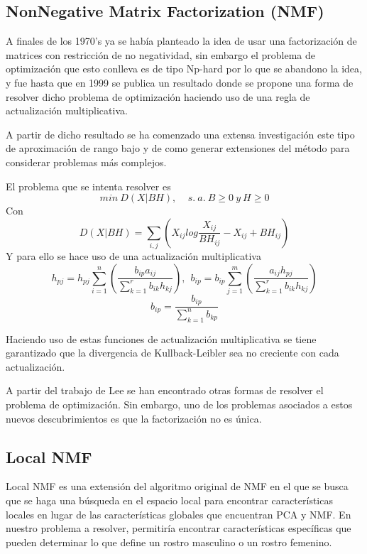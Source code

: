 \documentclass[a0,portrait]{a0poster}
\begin{document}
\begin{multicols}{3}
\subsection*{NonNegative Matrix Factorization (NMF)}
A finales de los 1970's ya se había planteado la idea de usar una factorización de matrices con restricción de no negatividad, sin embargo el problema de optimización que esto conlleva es de tipo Np-hard por lo que se abandono la idea, y fue hasta que en 1999 se publica un resultado donde se propone una forma de resolver dicho problema de optimización haciendo uso de una regla de actualización multiplicativa. \newline

A partir de dicho resultado se ha comenzado una extensa investigación este tipo de aproximación de rango bajo y de como generar extensiones del método para considerar problemas más complejos.\newline

El problema que se intenta resolver es
$$min \ D(X|BH), \ \ \ \ \ s. \ a. \ B\geq 0 \ y \ H\geq 0$$
Con $$D(X|BH)=\sum_{i,j}\left(X_{ij}log\frac{X_{ij}}{BH_{ij}} - X_{ij} + BH_{ij} \right)$$
Y para ello se hace uso de una actualización multiplicativa 
$$h_{pj}=h_{pj}\sum_{i=1}^n \left(\frac{b_{ip}a_{ij}}{\sum_{k=1}^r b_{ik}h_{kj}}\right), \ \ b_{ip}=b_{ip}\sum_{j=1}^m \left(\frac{a_{ij}h_{pj}}{\sum_{k=1}^r b_{ik}h_{kj}} \right)$$ $$b_{ip}=\frac{b_{ip}}{\sum_{k=1}^n b_{kp}}$$

Haciendo uso de estas funciones de actualización multiplicativa se tiene garantizado que la divergencia de Kullback-Leibler sea no creciente con cada actualización.\newline

A partir del trabajo de Lee se han encontrado otras formas de resolver el problema de optimización. Sin embargo, uno de los problemas asociados a estos nuevos descubrimientos es que la factorización no es única.


\subsection*{Local NMF}
Local NMF es una extensión del algoritmo original de NMF en el que se busca que se haga una búsqueda en el espacio local para encontrar características locales en lugar de las características globales que encuentran PCA y NMF. En nuestro problema a resolver, permitiría encontrar características específicas que pueden determinar lo que define un rostro masculino o un rostro femenino.\newline


\end{multicols}
\end{document}
